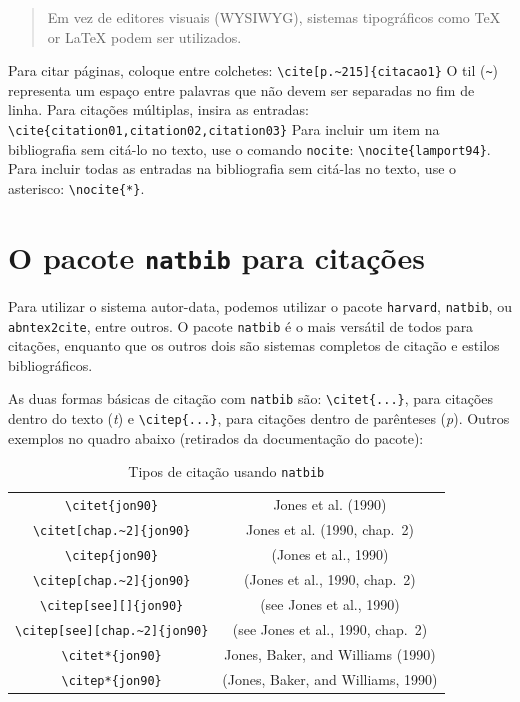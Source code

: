 \begin{quote}
Em vez de editores visuais (WYSIWYG), sistemas tipográficos como \TeX{} or \LaTeX{} \citep{lamport94} podem ser utilizados.
\end{quote}

Para citar páginas, coloque entre colchetes:
\verb+\cite[p.~215]{citacao1}+
O til (\verb+~+) representa um espaço entre palavras que não devem ser separadas no fim de linha. 
Para citações múltiplas, insira as entradas:\newline
\verb+\cite{citation01,citation02,citation03}+
Para incluir um item na bibliografia sem citá-lo no texto, use o comando \texttt{nocite}: \verb+\nocite{lamport94}+. Para incluir todas as entradas na bibliografia sem citá-las no texto, use o asterisco: \verb+\nocite{*}+. 

\section{O pacote \texttt{natbib} para citações}
\label{natbib}
Para utilizar o sistema autor-data, podemos utilizar o pacote \texttt{harvard}, \texttt{natbib}, ou \texttt{abntex2cite}, entre outros.
O pacote \texttt{natbib} é o mais versátil de todos para citações, enquanto que os outros dois são sistemas completos de citação e estilos bibliográficos.

As duas formas básicas de citação com \texttt{natbib} são: \verb+\citet{...}+, para citações dentro do texto (\textit{t}) e \verb+\citep{...}+, para citações dentro de parênteses (\textit{p}). Outros exemplos no quadro abaixo (retirados da documentação do pacote):


\begin{table}
\caption{\label{tab:natbib} Tipos de citação usando \texttt{natbib}}
\begin{tabular}{cc}
  \verb|\citet{jon90}| & Jones et al. (1990)\\
  \verb|\citet[chap.~2]{jon90}| & Jones et al. (1990, chap.~2)\\
  \verb|\citep{jon90}| & (Jones et al., 1990)\\
  \verb|\citep[chap.~2]{jon90}| & (Jones et al., 1990, chap.~2)\\
  \verb|\citep[see][]{jon90}| & (see Jones et al., 1990)\\
  \verb|\citep[see][chap.~2]{jon90}| & (see Jones et al., 1990, chap.~2)\\
  \verb|\citet*{jon90}| & Jones, Baker, and Williams (1990)\\
  \verb|\citep*{jon90}| & (Jones, Baker, and Williams, 1990)
\end{tabular}
\end{table}


